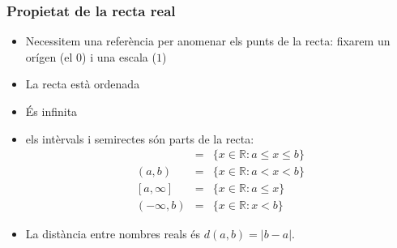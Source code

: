\documentclass{beamer}
\begin{document}
\begin{frame}
\frametitle{Propietat de la recta real}
\begin{itemize}
\item Necessitem una referència per anomenar els punts de la recta: fixarem un orígen (el $0$) i una escala ($1$)
\item La recta està ordenada
\item És infinita
\item els intèrvals i semirectes són parts de la recta:
  \begin{eqnarray}
    [a,b] &=& \{x \in \mathbb{R}: a \leq x \leq b\} \nonumber \\
    (a,b) &=& \{x \in \mathbb{R}: a < x < b\} \nonumber \\
    \left[a,\infty\right] &=& \{x \in \mathbb{R}: a \leq x\} \nonumber \\
    (-\infty, b) &=& \{x\in \mathbb{R}:x<b\}
  \end{eqnarray}
\item La distància entre nombres reals és $d(a,b) = |b-a|$.
\end{itemize}
\end{frame}
\end{document}
